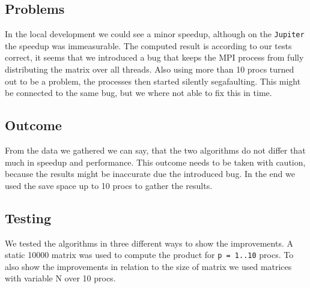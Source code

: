 \subsection{Problems}

In the local development we could see a minor speedup, although on the \texttt{Jupiter} the speedup was immeasurable.
The computed result is according to our tests correct, it seems that we introduced a bug that keeps the MPI process from fully distributing the matrix over all threads.
Also using more than 10 procs turned out to be a problem, the processes then started silently segafaulting.
This might be connected to the same bug, but we where not able to fix this in time.


\subsection{Outcome}

From the data we gathered we can say, that the two algorithms do not differ that much in speedup and performance.
This outcome needs to be taken with caution, because the results might be inaccurate due the introduced bug.
In the end we used the save space up to 10 procs to gather the results.

\subsection{Testing}

We tested the algorithms in three different ways to show the improvements.
A static 10000 matrix was used to compute the product for \texttt{p = 1..10} procs.
To also show the improvements in relation to the size of matrix we used matrices with variable N over 10 procs.



\AllgatherFixedProcs
{}\ReduceScatterFixedProcs



